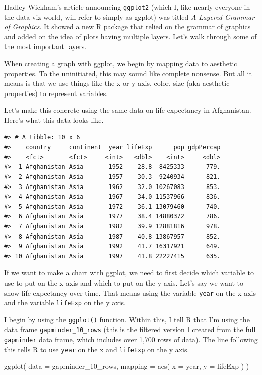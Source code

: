 \documentclass[
]{book}
\newenvironment{Shaded}{\begin{snugshade}}{\end{snugshade}}
\newcommand{\AttributeTok}[1]{\textcolor[rgb]{0.77,0.63,0.00}{#1}}
\newcommand{\FunctionTok}[1]{\textcolor[rgb]{0.00,0.00,0.00}{#1}}
\newcommand{\NormalTok}[1]{#1}
\begin{document}
Hadley Wickham's article announcing \texttt{ggplot2} (which I, like nearly everyone in the data viz world, will refer to simply as ggplot) was titled \emph{A Layered Grammar of Graphics}. It showed a new R package that relied on the grammar of graphics and added on the idea of plots having multiple layers. Let's walk through some of the most important layers.

When creating a graph with ggplot, we begin by mapping data to aesthetic properties. To the uninitiated, this may sound like complete nonsense. But all it means is that we use things like the x or y axis, color, size (aka aesthetic properties) to represent variables.

Let's make this concrete using the same data on life expectancy in Afghanistan. Here's what this data looks like.

\begin{verbatim}
#> # A tibble: 10 x 6
#>    country     continent  year lifeExp      pop gdpPercap
#>    <fct>       <fct>     <int>   <dbl>    <int>     <dbl>
#>  1 Afghanistan Asia       1952    28.8  8425333      779.
#>  2 Afghanistan Asia       1957    30.3  9240934      821.
#>  3 Afghanistan Asia       1962    32.0 10267083      853.
#>  4 Afghanistan Asia       1967    34.0 11537966      836.
#>  5 Afghanistan Asia       1972    36.1 13079460      740.
#>  6 Afghanistan Asia       1977    38.4 14880372      786.
#>  7 Afghanistan Asia       1982    39.9 12881816      978.
#>  8 Afghanistan Asia       1987    40.8 13867957      852.
#>  9 Afghanistan Asia       1992    41.7 16317921      649.
#> 10 Afghanistan Asia       1997    41.8 22227415      635.
\end{verbatim}

If we want to make a chart with ggplot, we need to first decide which variable to use to put on the x axis and which to put on the y axis. Let's say we want to show life expectancy over time. That means using the variable \texttt{year} on the x axis and the variable \texttt{lifeExp} on the y axis.

I begin by using the \texttt{ggplot()} function. Within this, I tell R that I'm using the data frame \texttt{gapminder\_10\_rows} (this is the filtered version I created from the full \texttt{gapminder} data frame, which includes over 1,700 rows of data). The line following this tells R to use \texttt{year} on the x and \texttt{lifeExp} on the y axis.

\begin{Shaded}
\begin{Highlighting}[]
\FunctionTok{ggplot}\NormalTok{(}
  \AttributeTok{data =}\NormalTok{ gapminder\_10\_rows,}
  \AttributeTok{mapping =} \FunctionTok{aes}\NormalTok{(}
    \AttributeTok{x =}\NormalTok{ year,}
    \AttributeTok{y =}\NormalTok{ lifeExp}
\NormalTok{  )}
\NormalTok{)}
\end{Highlighting}
\end{Shaded}
\end{document}
